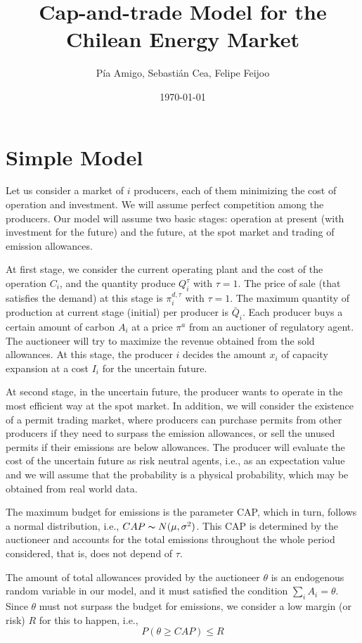 \documentclass[11pt, letterpaper]{article}
\title{Cap-and-trade Model for the Chilean Energy Market}
\author{P\'ia Amigo, Sebasti\'an Cea, Felipe Feijoo}
\date{\today}
\begin{document}
\maketitle

\section{Simple Model}\label{model}

Let us consider a market of $i$ producers, each of them minimizing the cost of operation and investment. We will assume perfect competition among the producers. Our model will assume two basic stages: operation at present (with investment for the future) and the future, at the spot market and trading of emission allowances. 

\smallskip

At first stage, we consider the current operating plant and the cost of the operation $C_i$, and the quantity produce $Q_i^{\tau}$ with $\tau=1$. The price of sale (that satisfies the demand) at this stage is $\pi^{d,\tau}_i$ with $\tau=1$. The maximum quantity of production at current stage (initial) per producer is $\bar{Q}_i$. Each producer buys a certain amount of carbon $A_i$ at a price $\pi^{a}$ from an auctioner of regulatory agent.  The auctioneer will try to maximize the revenue obtained from the sold allowances. At this stage, the producer $i$ decides the amount $x_i$ of capacity expansion at a cost $I_i$ for the uncertain future.
\smallskip

At second stage, in the uncertain future, the producer wants to operate in the most efficient way at the spot market. In addition,  we will consider the existence of a permit trading market, where producers can purchase permits from other producers if they need to surpass the emission allowances, or sell the unused permits if their emissions are below allowances. The producer will evaluate the cost of the uncertain future as risk neutral agents, i.e., as an expectation value and we will assume that the probability is a physical probability, which may be obtained from real world data.
\smallskip


The maximum budget for emissions is the  parameter CAP, which in turn, follows a normal distribution, i.e., $CAP \thicksim N(\mu, \sigma^2)$. This CAP is determined by the auctioneer and  accounts for the total emissions throughout the whole period considered, that is, does not depend of $\tau$. 


\smallskip
The amount of total allowances provided by the auctioneer $\theta$ is an endogenous random variable in our model, and it must satisfied the condition $\sum_i A_i = \theta$. 
Since $\theta$ must not surpass the budget for emissions, we consider a low margin (or risk) $R$ for this to happen, i.e.,
\begin{equation}
    P (\theta \geq CAP) \leq R
\end{equation}
\end{document}
